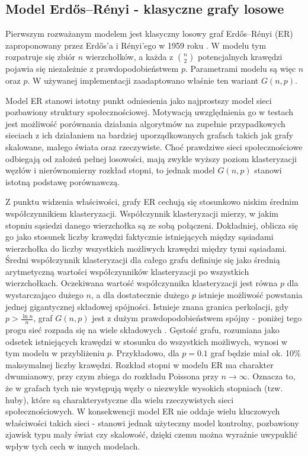 \subsection{Model Erdős--Rényi - klasyczne grafy losowe}
Pierwszym rozważanym modelem jest klasyczny losowy graf Erdős--Rényi (ER) zaproponowany przez Erd\H{o}s'a i Rényi'ego w 1959 roku \cite{ErdosRenyi1960}. W modelu tym rozpatruje się zbiór $n$ wierzchołków, a każda z $\binom{n}{2}$ potencjalnych krawędzi pojawia się niezależnie z prawdopodobieństwem $p$. Parametrami modelu są więc $n$ oraz $p$. W używanej implementacji zaadaptowano właśnie ten wariant $G(n,p)$.

Model ER stanowi istotny punkt odniesienia jako najprostszy model sieci pozbawiony struktury społecznościowej. Motywacją uwzględnienia go w testach jest możliwość porównania działania algorytmów na zupełnie przypadkowych sieciach z ich działaniem na bardziej uporządkowanych grafach takich jak grafy skalowane, małego świata oraz rzeczywiste. Choć prawdziwe sieci społecznościowe odbiegają od założeń pełnej losowości, mają zwykle wyższy poziom klasteryzacji węzłów i nierównomierny rozkład stopni, to jednak model $G(n, p)$ stanowi istotną podstawę porównawczą.

Z punktu widzenia właściwości, grafy ER cechują się stosunkowo niskim średnim współczynnikiem klasteryzacji.
Współczynnik klasteryzacji mierzy, w jakim stopniu sąsiedzi danego wierzchołka są ze sobą połączeni. 
Dokładniej, oblicza się go jako stosunek liczby krawędzi faktycznie istniejących między sąsiadami wierzchołka do liczby wszystkich możliwych krawędzi między tymi sąsiadami. 
Średni współczynnik klasteryzacji dla całego grafu definiuje się jako średnią arytmetyczną wartości współczynników klasteryzacji po wszystkich wierzchołkach.
Oczekiwana wartość współczynnika klasteryzacji jest równa $p$ dla wystarczająco dużego $n$, a dla dostatecznie dużego $p$ istnieje możliwość powstania jednej gigantycznej składowej spójności.
Istnieje znana granica perkolacji, gdy $p>\frac{\ln n}{n}$, graf $G(n, p)$ jest z dużym prawdopodobieństwem spójny - poniżej tego progu sieć rozpada się na wiele składowych \cite{ErdosRenyi1960}. Gęstość grafu, rozumiana jako odsetek istniejących krawędzi w stosunku do wszystkich możliwych, wynosi w tym modelu w przybliżeniu $p$. Przykładowo, dla $p=0.1$ graf będzie miał ok. 10\% maksymalnej liczby krawędzi. Rozkład stopni w modelu ER ma charakter dwumianowy, przy czym zbiega do rozkładu Poissona przy $n\to\infty$. Oznacza to, że w grafach tych nie występują węzły o niezwykle wysokich stopniach (tzw. huby), które są charakterystyczne dla wielu rzeczywistych sieci społecznościowych. W konsekwencji model ER nie oddaje wielu kluczowych właściwości takich sieci - stanowi jednak użyteczny model kontrolny, pozbawiony zjawisk typu mały świat czy skalowość, dzięki czemu można wyraźnie uwypuklić wpływ tych cech w innych modelach.


